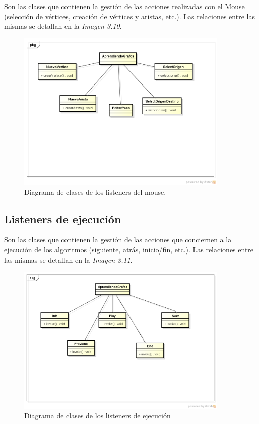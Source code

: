 \documentclass{book}
\begin{document}
Son las clases que contienen la gestión de las acciones realizadas con el Mouse (selección de vértices, creación de vértices y aristas, etc.).
Las relaciones entre las mismas se detallan en la \textit{Imagen 3.10}.
\begin{figure}[H]
	\centering
	\includegraphics[width=0.9\textwidth]{images/mouse.png}
	\medskip
	\caption{Diagrama de clases de los listeners del mouse.}
	\medskip
\end{figure}
\bigskip

\subsection{Listeners de ejecución}

Son las clases que contienen la gestión de las acciones que conciernen a la ejecución de los algoritmos (siguiente, atrás, inicio/fin, etc.).
Las relaciones entre las mismas se detallan en la \textit{Imagen 3.11}.
\begin{figure}[H]
	\centering
	\includegraphics[width=0.9\textwidth]{images/ejecucion.png}
	\medskip
	\caption{Diagrama de clases de los listeners de ejecución}
	\medskip
\end{figure}
\bigskip
\end{document}
